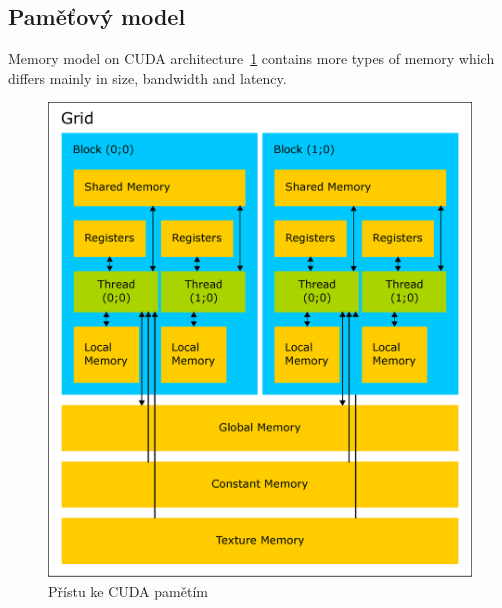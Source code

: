 \subsection{Paměťový model}

Memory model on CUDA architecture~\ref{fig:cudamemaccess} contains more types of memory which differs mainly in size, bandwidth and latency.

\begin{figure}[h]
  \centering
  \includegraphics[width=0.6\linewidth]{img/CUDAmemAccess.eps}
  \caption{Přístu ke CUDA pamětím}
  \label{fig:cudamemaccess}
\end{figure}

